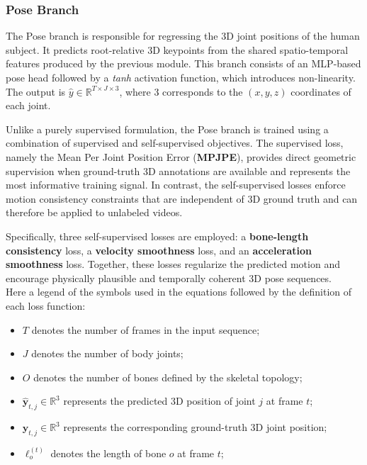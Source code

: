 \subsubsection{Pose Branch}
\label{sec:pose3d_branch}
The Pose branch is responsible for regressing the 3D joint positions of the human subject.
It predicts root-relative 3D keypoints from the shared spatio-temporal features produced by the previous module.
This branch consists of an MLP-based pose head followed by a \textit{tanh} activation function, which introduces non-linearity.\\
The output is $\hat{y} \in \mathbb{R}^{T \times J \times 3}$, where $3$ corresponds to the $(x, y, z)$ coordinates of each joint.

Unlike a purely supervised formulation, the Pose branch is trained using a combination of supervised and self-supervised objectives.
The supervised loss, namely the Mean Per Joint Position Error (\textbf{MPJPE}), provides direct geometric supervision when ground-truth 3D annotations are available and represents the most informative training signal.
In contrast, the self-supervised losses enforce motion consistency constraints that are independent of 3D ground truth and can therefore be applied to unlabeled videos.

Specifically, three self-supervised losses are employed: a \textbf{bone-length consistency} loss, a \textbf{velocity smoothness} loss, and an \textbf{acceleration smoothness} loss.
Together, these losses regularize the predicted motion and encourage physically plausible and temporally coherent 3D pose sequences.\\
Here a legend of the symbols used in the equations followed by the definition of each loss function:
\begin{itemize}
    \item $T$ denotes the number of frames in the input sequence;
    \item $J$ denotes the number of body joints;
    \item $O$ denotes the number of bones defined by the skeletal topology;
    \item $\hat{\mathbf{y}}_{t,j} \in \mathbb{R}^3$ represents the predicted 3D position of joint $j$ at frame $t$;
    \item $\mathbf{y}_{t,j} \in \mathbb{R}^3$ represents the corresponding ground-truth 3D joint position;
    \item $\ell_{o}^{(t)}$ denotes the length of bone $o$ at frame $t$;
\end{itemize}


